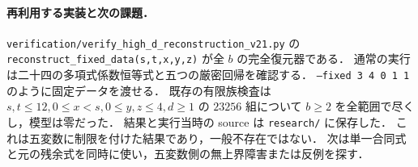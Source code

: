 \paragraph{再利用する実装と次の課題．}
\nolinkurl{verification/verify_high_d_reconstruction_v21.py} の
\texttt{reconstruct\_fixed\_data(s,t,x,y,z)} が全 $b$ の完全復元器である．
通常の実行は二十四の多項式係数恒等式と五つの厳密回帰を確認する．
\texttt{--fixed 3 4 0 1 1} のように固定データを渡せる．
既存の有限族検査は $s,t\le12,0\le x<s,0\le y,z\le4,d\ge1$ の
$23256$ 組について $b\ge2$ を全範囲で尽くし，模型は零だった．
結果と実行当時の source は \nolinkurl{research/} に保存した．
これは五変数に制限を付けた結果であり，一般不存在ではない．
次は単一合同式と元の残余式を同時に使い，五変数側の無上界障害または反例を探す．
